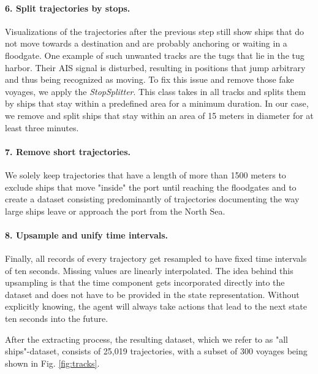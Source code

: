 \paragraph{6. Split trajectories by stops.}
Visualizations of the trajectories after the previous step still show ships that do not move towards a destination and are probably anchoring or waiting in a floodgate. One example of such unwanted tracks are the tugs that lie in the tug harbor. Their AIS signal is disturbed, resulting in positions that jump arbitrary and thus being recognized as moving. To fix this issue and remove those fake voyages, we apply the \textit{StopSplitter}. This class takes in all tracks and splits them by ships that stay within a predefined area for a minimum duration. In our case, we remove and split ships that stay within an area of 15 meters in diameter for at least three minutes.


\paragraph{7. Remove short trajectories.}
We solely keep trajectories that have a length of more than 1500 meters to  exclude ships that move "inside" the port until reaching the floodgates and to create a dataset consisting predominantly of trajectories documenting the way large ships leave or approach the port from the North Sea.

\paragraph{8. Upsample and unify time intervals.}
Finally, all records of every trajectory get resampled to have fixed time intervals of ten seconds. Missing values are linearly interpolated. The idea behind this upsampling is that the time component gets incorporated directly into the dataset and does not have to be provided in the state representation. Without explicitly knowing, the agent will always take actions that lead to the next state ten seconds into the future.
\par

After the extracting process, the resulting dataset, which we refer to as "all ships"-dataset, consists of 25,019 trajectories, with a subset of 300 voyages being shown in Fig. \ref{fig:tracks}.

